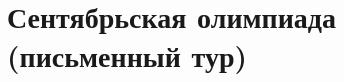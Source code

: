 






\begingroup

\providecommand\ifolympiadsolutions{\iffalse}
\providecommand\ifolympiadcriteria{\iffalse}

\newcommand\olympiadsolution[1]{\ifolympiadsolutions#1\fi}
\newcommand\olympiadcriterion[1]{\ifolympiadcriteria#1\fi}

\section*{Сентябрьская олимпиада (письменный тур)}

\olympiadsolution{\subsection*{с решениями}}
\olympiadcriterion{\subsection*{с критериями}}


